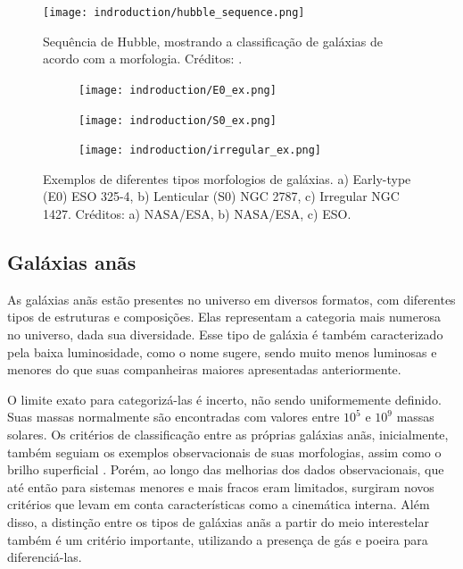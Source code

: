 \begin{figure}[!ht]
    \begin{center}
    \texttt{[image: indroduction/hubble\_sequence.png]}
    \caption[]{Sequência de Hubble, mostrando a classificação de galáxias de acordo com a morfologia. Créditos: \cite{huble_sequence_img}.}
    \label{hubble_sequence}
    \end{center}
\end{figure}


\begin{figure}[!ht]
    \centering
    \captionsetup{justification=centering}
    \begin{subfigure}[b]{0.237\textwidth}
        \texttt{[image: indroduction/E0\_ex.png]}
        \caption{}
    \end{subfigure}
    \begin{subfigure}[b]{0.26\textwidth}
        \texttt{[image: indroduction/S0\_ex.png]}
        \caption{}
    \end{subfigure}
    \begin{subfigure}[b]{0.268\textwidth}
        \texttt{[image: indroduction/irregular\_ex.png]}
        \caption{}
    \end{subfigure}
    \caption{Exemplos de diferentes tipos morfologios de galáxias. a) Early-type (E0) ESO 325-4, b) Lenticular (S0) NGC 2787, c) Irregular NGC 1427. Créditos: a) NASA/ESA, b) NASA/ESA, c) ESO.}
    \label{galaxies_morphology}
\end{figure}


\subsection{Galáxias anãs}\label{subsec:}
As galáxias anãs estão presentes no universo em diversos formatos, com diferentes tipos de estruturas e composições. Elas representam a categoria mais numerosa no universo, dada sua diversidade. Esse tipo de galáxia é também caracterizado pela baixa luminosidade, como o nome sugere, sendo muito menos luminosas e menores do que suas companheiras maiores apresentadas anteriormente.

O limite exato para categorizá-las é incerto, não sendo uniformemente definido. Suas massas normalmente são encontradas com valores entre $10^5$ e $10^9$ massas solares. Os critérios de classificação entre as próprias galáxias anãs, inicialmente, também seguiam os exemplos observacionais de suas morfologias, assim como o brilho superficial \citep{dwarf_classification_init}. Porém, ao longo das melhorias dos dados observacionais, que até então para sistemas menores e mais fracos eram limitados, surgiram novos critérios que levam em conta características como a cinemática interna. Além disso, a distinção entre os tipos de galáxias anãs a partir do meio interestelar também é um critério importante, utilizando a presença de gás e poeira para diferenciá-las.

